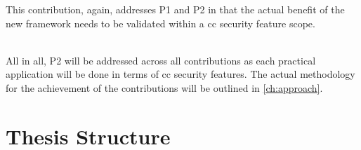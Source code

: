 This contribution, again, addresses P1 and P2 in that the actual benefit of the new framework needs to be validated within a \ac{cc} security feature scope. \\\

All in all, P2 will be addressed across all contributions as each practical application will be done in terms of \ac{cc} security features. The actual methodology for the achievement of the contributions will be outlined in \autoref{ch:approach}.

\section{Thesis Structure} \label{sec:intro-structure}
